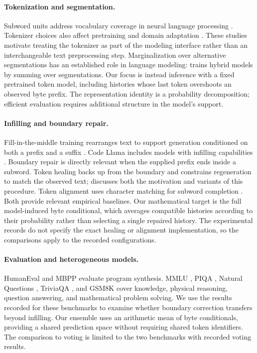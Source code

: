 \documentclass{article}
\begin{document}
\paragraph{Tokenization and segmentation.}
Subword units address vocabulary coverage in neural language processing \citep{sennrich2016}. Tokenizer choices also affect pretraining and domain adaptation \citep{dagan2024}. These studies motivate treating the tokenizer as part of the modeling interface rather than an interchangeable text preprocessing step. Marginalization over alternative segmentations has an established role in language modeling: \citet{grave2019} trains hybrid models by summing over segmentations. Our focus is instead inference with a fixed pretrained token model, including histories whose last token overshoots an observed byte prefix. The representation identity is a probability decomposition; efficient evaluation requires additional structure in the model's support.

\paragraph{Infilling and boundary repair.}
Fill-in-the-middle training rearranges text to support generation conditioned on both a prefix and a suffix \citep{bavarian2022}. Code Llama includes models with infilling capabilities \citep{roziere2023}. Boundary repair is directly relevant when the supplied prefix ends inside a subword. Token healing backs up from the boundary and constrains regeneration to match the observed text; \citet{dagan2024} discusses both the motivation and variants of this procedure. Token alignment uses character matching for subword completion \citep{athiwaratkun2024}. Both provide relevant empirical baselines. Our mathematical target is the full model-induced byte conditional, which averages compatible histories according to their probability rather than selecting a single repaired history. The experimental records do not specify the exact healing or alignment implementation, so the comparisons apply to the recorded configurations.

\paragraph{Evaluation and heterogeneous models.}
HumanEval \citep{chen2021} and MBPP \citep{austin2021} evaluate program synthesis. MMLU \citep{hendrycks2020}, PIQA \citep{bisk2020}, Natural Questions \citep{kwiatkowski2019}, TriviaQA \citep{joshi2017}, and GSM8K \citep{cobbe2021} cover knowledge, physical reasoning, question answering, and mathematical problem solving. We use the results recorded for these benchmarks to examine whether boundary correction transfers beyond infilling. Our ensemble uses an arithmetic mean of byte conditionals, providing a shared prediction space without requiring shared token identifiers. The comparison to voting is limited to the two benchmarks with recorded voting results.
\end{document}
